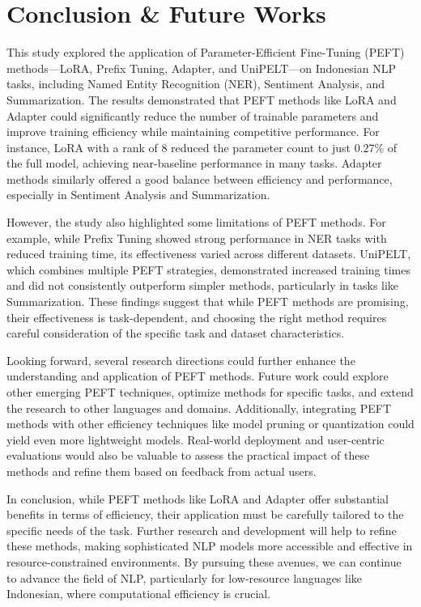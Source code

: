 \section{Conclusion \& Future Works}

This study explored the application of Parameter-Efficient Fine-Tuning (PEFT) methods—LoRA, Prefix Tuning, Adapter, and UniPELT—on Indonesian NLP tasks, including Named Entity Recognition (NER), Sentiment Analysis, and Summarization. The results demonstrated that PEFT methods like LoRA and Adapter could significantly reduce the number of trainable parameters and improve training efficiency while maintaining competitive performance. For instance, LoRA with a rank of 8 reduced the parameter count to just 0.27\% of the full model, achieving near-baseline performance in many tasks. Adapter methods similarly offered a good balance between efficiency and performance, especially in Sentiment Analysis and Summarization.

However, the study also highlighted some limitations of PEFT methods. For example, while Prefix Tuning showed strong performance in NER tasks with reduced training time, its effectiveness varied across different datasets. UniPELT, which combines multiple PEFT strategies, demonstrated increased training times and did not consistently outperform simpler methods, particularly in tasks like Summarization. These findings suggest that while PEFT methods are promising, their effectiveness is task-dependent, and choosing the right method requires careful consideration of the specific task and dataset characteristics.

Looking forward, several research directions could further enhance the understanding and application of PEFT methods. Future work could explore other emerging PEFT techniques, optimize methods for specific tasks, and extend the research to other languages and domains. Additionally, integrating PEFT methods with other efficiency techniques like model pruning or quantization could yield even more lightweight models. Real-world deployment and user-centric evaluations would also be valuable to assess the practical impact of these methods and refine them based on feedback from actual users.

In conclusion, while PEFT methods like LoRA and Adapter offer substantial benefits in terms of efficiency, their application must be carefully tailored to the specific needs of the task. Further research and development will help to refine these methods, making sophisticated NLP models more accessible and effective in resource-constrained environments. By pursuing these avenues, we can continue to advance the field of NLP, particularly for low-resource languages like Indonesian, where computational efficiency is crucial.
